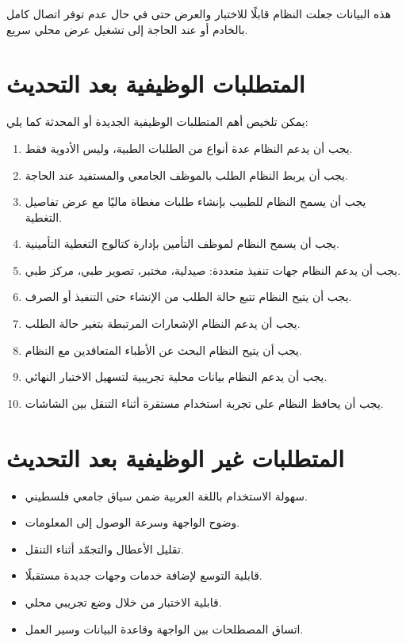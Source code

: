 \documentclass[12pt,a4paper]{report}
\begin{document}
هذه البيانات جعلت النظام قابلًا للاختبار والعرض حتى في حال عدم توفر اتصال كامل بالخادم أو عند الحاجة إلى تشغيل عرض محلي سريع.

\chapter{المتطلبات الوظيفية بعد التحديث}

يمكن تلخيص أهم المتطلبات الوظيفية الجديدة أو المحدثة كما يلي:

\begin{enumerate}[itemsep=4pt]
  \item يجب أن يدعم النظام عدة أنواع من الطلبات الطبية، وليس الأدوية فقط.
  \item يجب أن يربط النظام الطلب بالموظف الجامعي والمستفيد عند الحاجة.
  \item يجب أن يسمح النظام للطبيب بإنشاء طلبات مغطاة ماليًا مع عرض تفاصيل التغطية.
  \item يجب أن يسمح النظام لموظف التأمين بإدارة كتالوج التغطية التأمينية.
  \item يجب أن يدعم النظام جهات تنفيذ متعددة: صيدلية، مختبر، تصوير طبي، مركز طبي.
  \item يجب أن يتيح النظام تتبع حالة الطلب من الإنشاء حتى التنفيذ أو الصرف.
  \item يجب أن يدعم النظام الإشعارات المرتبطة بتغير حالة الطلب.
  \item يجب أن يتيح النظام البحث عن الأطباء المتعاقدين مع النظام.
  \item يجب أن يدعم النظام بيانات محلية تجريبية لتسهيل الاختبار النهائي.
  \item يجب أن يحافظ النظام على تجربة استخدام مستقرة أثناء التنقل بين الشاشات.
\end{enumerate}

\chapter{المتطلبات غير الوظيفية بعد التحديث}

\begin{itemize}[itemsep=4pt]
  \item سهولة الاستخدام باللغة العربية ضمن سياق جامعي فلسطيني.
  \item وضوح الواجهة وسرعة الوصول إلى المعلومات.
  \item تقليل الأعطال والتجمّد أثناء التنقل.
  \item قابلية التوسع لإضافة خدمات وجهات جديدة مستقبلًا.
  \item قابلية الاختبار من خلال وضع تجريبي محلي.
  \item اتساق المصطلحات بين الواجهة وقاعدة البيانات وسير العمل.
\end{itemize}
\end{document}
